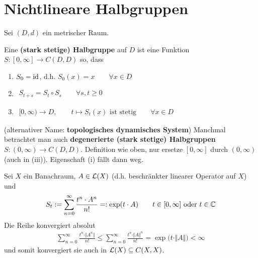 
\chapter{Nichtlineare Halbgruppen} %
\setcounter{section}{1}
Sei $(D,d)$ ein metrischer Raum.

\begin{definition}
Eine \textbf{(stark stetige) Halbgruppe} auf $D$ ist eine Funktion\\ $S:[0,\infty]\to C(D,D)$ so, dass 
\begin{enumerate}[label=(\roman*)]
\item $S_0=\operatorname{id}$, d.h. $S_0(x)=x\qquad\forall x\in D$
\item $\begin{aligned}
S_{t+s}=S_t\circ S_s\qquad\forall s,t\geq0
\end{aligned}$
\item $\begin{aligned}
[0,\infty)\to D,\qquad t\mapsto S_t(x)\text{ ist stetig}\qquad\forall x\in D
\end{aligned}$
\end{enumerate}
(alternativer Name: \textbf{topologisches dynamisches System})\nl
Manchmal betrachtet man auch \textbf{degenerierte (stark stetige) Halbgruppen}\\ $S\colon (0,\infty)\to C(D,D)$. Definition wie oben, nur ersetze $[0,\infty]$ durch $(0,\infty)$ (auch in (iii)). Eigenschaft (i) fällt dann weg.
\end{definition}

\begin{beispiel}[Exponentialfunktion]\enter
Sei $X$ ein Banachraum, $A\in\mathcal{L}(X)$ (d.h. beschränkter linearer Operator auf $X$) und 
\begin{align*}
S_t:=\sum\limits_{n=0}^\infty\frac{t^n\cdot A^n}{n!}=:\exp(t\cdot A)\qquad t\in[0,\infty]\text{ oder }t\in\mathbb{C}
\end{align*}
Die Reihe konvergiert absolut
\begin{align*}
\sum\limits_{n=0}^\infty \frac{t^n\cdot\Vert A^n\Vert}{n!}\leq\sum\limits_{n=0}^\infty\frac{t^n\cdot\Vert A\Vert^n}{	n!}=\exp\big(t\cdot\Vert A\Vert\big)<\infty
\end{align*}
und somit konvergiert sie auch in $\mathcal{L}(X)\subseteq C(X,X)$.
\end{beispiel}





